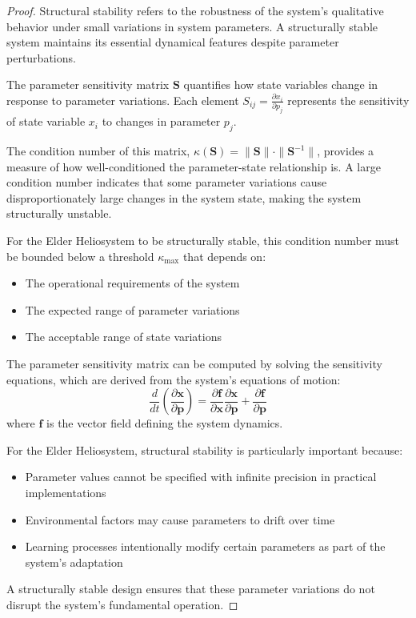 \begin{proof}
Structural stability refers to the robustness of the system's qualitative behavior under small variations in system parameters. A structurally stable system maintains its essential dynamical features despite parameter perturbations.

The parameter sensitivity matrix $\mathbf{S}$ quantifies how state variables change in response to parameter variations. Each element $S_{ij} = \frac{\partial x_i}{\partial p_j}$ represents the sensitivity of state variable $x_i$ to changes in parameter $p_j$.

The condition number of this matrix, $\kappa(\mathbf{S}) = \|\mathbf{S}\| \cdot \|\mathbf{S}^{-1}\|$, provides a measure of how well-conditioned the parameter-state relationship is. A large condition number indicates that some parameter variations cause disproportionately large changes in the system state, making the system structurally unstable.

For the Elder Heliosystem to be structurally stable, this condition number must be bounded below a threshold $\kappa_{\text{max}}$ that depends on:
\begin{itemize}
    \item The operational requirements of the system
    \item The expected range of parameter variations
    \item The acceptable range of state variations
\end{itemize}

The parameter sensitivity matrix can be computed by solving the sensitivity equations, which are derived from the system's equations of motion:
\begin{equation}
\frac{d}{dt}\left(\frac{\partial \mathbf{x}}{\partial \mathbf{p}}\right) = \frac{\partial \mathbf{f}}{\partial \mathbf{x}} \frac{\partial \mathbf{x}}{\partial \mathbf{p}} + \frac{\partial \mathbf{f}}{\partial \mathbf{p}}
\end{equation}
where $\mathbf{f}$ is the vector field defining the system dynamics.

For the Elder Heliosystem, structural stability is particularly important because:
\begin{itemize}
    \item Parameter values cannot be specified with infinite precision in practical implementations
    \item Environmental factors may cause parameters to drift over time
    \item Learning processes intentionally modify certain parameters as part of the system's adaptation
\end{itemize}

A structurally stable design ensures that these parameter variations do not disrupt the system's fundamental operation.
\end{proof}

